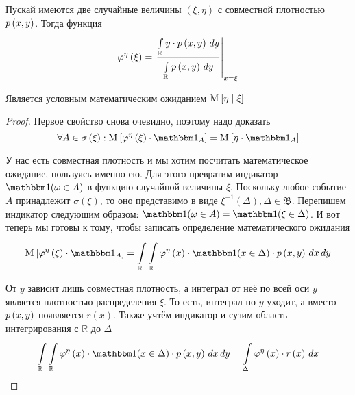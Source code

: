 \begin{lemma}
    Пускай имеются две случайные величины $\left( \xi, \eta \right)$
    с совместной плотностью $\pdf{x,y}$.
    Тогда функция
    $$\varphi^{\eta}\left( \xi \right)
        = \left. \frac{\integral{\mathbb{R}}{}{y}{y \cdot \pdf{x,y}}}
            {\integral{\mathbb{R}}{}{y}{\pdf{x,y}}} \right|_{x=\xi}$$

    Является условным математическим ожиданием
    $\Mean{ \eta \mcond \xi }$

\end{lemma}
\begin{proof}
Первое свойство снова очевидно, поэтому надо доказать
\begin{equation}\label{conditionalExpectationContinualStart}
    \forall A \in \sigma\left( \xi \right):
        \Mean{\varphi^{\eta}\left( \xi \right) \cdot \indicatorof{A}}
            = \Mean{ \eta \cdot \indicatorof{A} }
\end{equation}

У нас есть совместная плотность и мы хотим посчитать математическое ожидание,
пользуясь именно ею.
Для этого превратим индикатор $\indicator{\omega \in A}$
в функцию случайной величины $\xi$.
Поскольку любое событие $A$ принадлежит $\sigma\left( \xi \right)$,
то оно представимо в виде
$\xi^{-1}\left( \Delta \right), \Delta \in \mathfrak{B}$.
Перепишем индикатор следующим образом:
$\indicator{\omega \in A} = \indicator{\xi \in \Delta}$.
И вот теперь мы готовы к тому,
чтобы записать определение математического ожидания
$$\Mean{ \varphi^{\eta}\left( \xi \right) \cdot \indicatorof{A} }
    = \integral{\mathbb{R}}{}{y}{ \integral{\mathbb{R}}{}{x}{
        \varphi^{\eta}\left( x \right) \cdot \indicator{x \in \Delta}
            \cdot \pdf{x,y}}}$$

От $y$ зависит лишь совместная плотность, а интеграл от неё по всей оси $y$
является плотностью распределения $\xi$.
То есть, интеграл по $y$ уходит,
а вместо $\pdf{x,y}$ появляется $r\left( x \right)$.
Также учтём индикатор и сузим область интегрирования с $\mathbb{R}$ до $\Delta$
$$\integral{\mathbb{R}}{}{y}{ \integral{\mathbb{R}}{}{x}{
    \varphi^{\eta}\left( x \right) \cdot \indicator{x \in \Delta}
        \cdot \pdf{x,y}}}
    = \integral{\Delta}{}{x}{
        \varphi^{\eta}\left( x \right) \cdot r\left( x \right)}$$


\end{proof}
